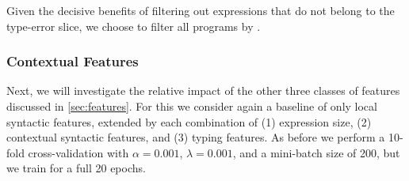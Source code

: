 Given the decisive benefits of filtering out expressions that do not
belong to the type-error slice, we choose to filter all programs by
\InSlice.

\subsubsection{Contextual Features}
\label{sec:contextual-features}

Next, we will investigate the relative impact of the other three classes
of features discussed in \autoref{sec:features}.
%
For this we consider again a baseline of only local syntactic features,
extended by each combination of
%
(1) expression size,
(2) contextual syntactic features, and
(3) typing features.
%
As before we perform a 10-fold cross-validation with $\alpha = 0.001$,
$\lambda = 0.001$, and a mini-batch size of 200, but we
train for a full 20 epochs.

